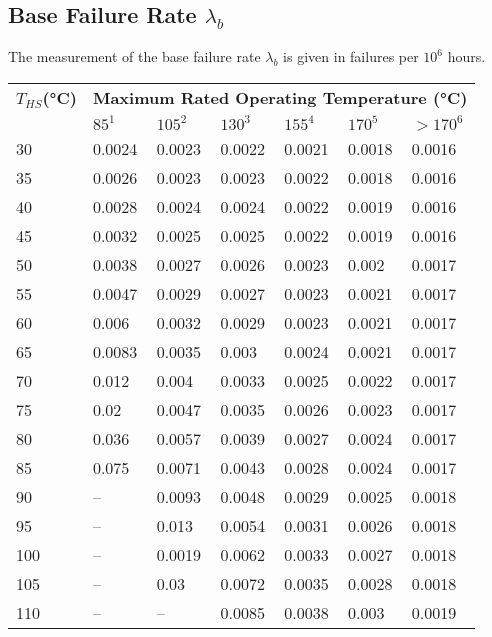\subsection{Base Failure Rate $\lambda_b$}
The measurement of the base failure rate $\lambda_b$ is given in failures per $10^6$ hours.
\begin{table}[ht]
{\centering

\begin{tabular}{|p{1.3cm}|*{6}{p{1.2cm}|}}
    \hline
    \textbf{$T_{HS}$(°C)} & \multicolumn{6}{c|}{\textbf{Maximum Rated Operating Temperature (°C)}} \\
    & $85^1$ & $105^2$ & $130^3$ & $155^4$ & $170^5$ & $>170^6$ \\
    \hline
    30 & 0.0024 & 0.0023 & 0.0022 & 0.0021 & 0.0018 & 0.0016 \\
    \hline
    35 & 0.0026 & 0.0023 & 0.0023 & 0.0022 & 0.0018 & 0.0016 \\
    \hline
    40 & 0.0028 & 0.0024 & 0.0024 & 0.0022 & 0.0019 & 0.0016 \\
    \hline
    45 & 0.0032 & 0.0025 & 0.0025 & 0.0022 & 0.0019 & 0.0016 \\
    \hline
    50 & 0.0038 & 0.0027 & 0.0026 & 0.0023 & 0.002 & 0.0017 \\
    \hline
    55 & 0.0047 & 0.0029 & 0.0027 & 0.0023 & 0.0021 & 0.0017 \\
    \hline
    60 & 0.006 & 0.0032 & 0.0029 & 0.0023 & 0.0021 & 0.0017 \\
    \hline
    65 & 0.0083 & 0.0035 & 0.003 & 0.0024 & 0.0021 & 0.0017 \\
    \hline
    70 & 0.012 & 0.004 & 0.0033 & 0.0025 & 0.0022 & 0.0017 \\
    \hline
    75 & 0.02 & 0.0047 & 0.0035 & 0.0026 & 0.0023  & 0.0017 \\
    \hline
    80 & 0.036 & 0.0057 & 0.0039 & 0.0027 & 0.0024 & 0.0017 \\
    \hline
    85 & 0.075 & 0.0071 & 0.0043 & 0.0028 & 0.0024 & 0.0017 \\
    \hline
    90 & -- & 0.0093 & 0.0048 & 0.0029 & 0.0025 & 0.0018 \\
    \hline
    95 & -- & 0.013 & 0.0054 & 0.0031 & 0.0026 & 0.0018 \\
    \hline
    100 & -- & 0.0019 & 0.0062 & 0.0033 & 0.0027 & 0.0018 \\
    \hline
    105 & -- & 0.03 & 0.0072 & 0.0035 & 0.0028 & 0.0018 \\
    \hline
    110 & -- & -- & 0.0085 & 0.0038 & 0.003 & 0.0019 \\

\end{tabular}}
\end{table}
